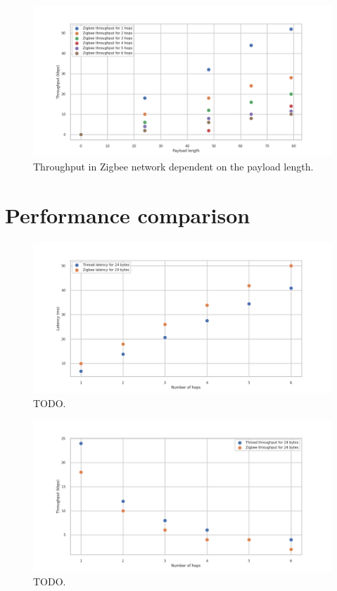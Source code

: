 \begin{figure}[H]
    \centering
    \includegraphics[scale=0.45]{images/Zigbee_Throughput_vs_length.png}
    \caption{Throughput in Zigbee network dependent on the payload length. }
    \label{fig:zigbee_throughput_length}
\end{figure}

\section{Performance comparison}

\begin{figure}[H]
    \centering
    \includegraphics[scale=0.45]{images/Thread_vs_Zigbee_Latency.png}
    \caption{TODO.}
    \label{fig:thread_vs_zigbee_latency}
\end{figure}

\begin{figure}[H]
    \centering
    \includegraphics[scale=0.45]{images/Thread_vs_Zigbee_Throoughput.png}
    \caption{TODO.}
    \label{fig:thread_vs_zigbee_throughput}
\end{figure}
